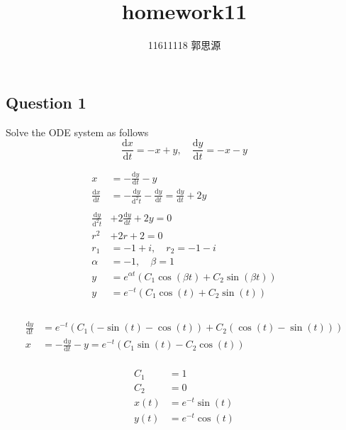 \documentclass[12pt,a4paper]{article}
\newcommand{\dd}{\mathrm{d}}
\begin{document}
 
\title{homework11}
	\author{11611118 郭思源}  
\begin{spacing}{1.5}%

\section{Question 1}

Solve the ODE system as follows
\[
    \frac{\dd x}{\dd t} = - x + y, \quad
    \frac{\dd y}{\dd t} = - x - y
\]




\begin{equation*}
	\begin{aligned}
		x &=  -\frac{\dd y}{\dd t}-y \\
		\frac{\dd x}{\dd t} &= -\frac{\dd y}{\dd^2 t} -\frac{\dd y}{\dd t} = \frac{\dd y}{\dd t}+2y \\\\
		\frac{\dd y}{\dd^2 t} &+ 2\frac{\dd y}{\dd t} + 2y = 0 \\
		r^2 &+ 2r + 2 = 0 \\
		r_1 &= - 1 +  i, \quad r_2 = - 1 -  i \\
		\alpha &= -1, \quad \beta = 1 \\
		y &= e^{\alpha t}(C_1\cos(\beta t)+C_2\sin(\beta t)) \\
		y &= e^{-t}(C_1\cos(t)+C_2\sin(t)) \\\\
	\end{aligned}
\end{equation*}

\begin{equation*}
	\begin{aligned}
		\frac{\dd y}{\dd t} &= e^{-t}(C_1(-\sin(t)-\cos(t))+C_2(\cos(t)-\sin(t)))\\
		x &=  -\frac{\dd y}{\dd t}-y =  e^{-t}(C_1\sin(t)-C_2\cos(t)) \\
	\end{aligned}
\end{equation*}

\begin{equation*}
	\begin{aligned}
		C_1 &= 1 \\
		C_2 &= 0 \\
		x(t) &= e^{-t}\sin(t) \\
		y(t) &= e^{-t}\cos(t) \\
	\end{aligned}
\end{equation*}



\end{spacing}
\end{document}
